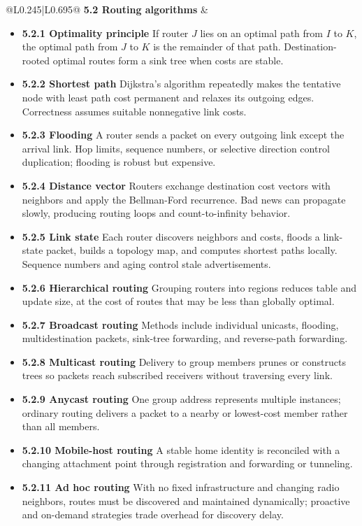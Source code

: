 \documentclass[10pt,letterpaper]{article}
\begin{document}
\begin{longtable}{@{}L{0.245\textwidth}|L{0.695\textwidth}@{}}
\textbf{5.2 Routing algorithms} & \begin{minipage}[t]{\linewidth}\raggedright \begin{itemize}\item \textbf{5.2.1 Optimality principle} If router $J$ lies on an optimal path from $I$ to $K$, the optimal path from $J$ to $K$ is the remainder of that path. Destination-rooted optimal routes form a sink tree when costs are stable.\item \textbf{5.2.2 Shortest path} Dijkstra's algorithm repeatedly makes the tentative node with least path cost permanent and relaxes its outgoing edges. Correctness assumes suitable nonnegative link costs.\item \textbf{5.2.3 Flooding} A router sends a packet on every outgoing link except the arrival link. Hop limits, sequence numbers, or selective direction control duplication; flooding is robust but expensive.\item \textbf{5.2.4 Distance vector} Routers exchange destination cost vectors with neighbors and apply the Bellman-Ford recurrence. Bad news can propagate slowly, producing routing loops and count-to-infinity behavior.\item \textbf{5.2.5 Link state} Each router discovers neighbors and costs, floods a link-state packet, builds a topology map, and computes shortest paths locally. Sequence numbers and aging control stale advertisements.\item \textbf{5.2.6 Hierarchical routing} Grouping routers into regions reduces table and update size, at the cost of routes that may be less than globally optimal.\item \textbf{5.2.7 Broadcast routing} Methods include individual unicasts, flooding, multidestination packets, sink-tree forwarding, and reverse-path forwarding.\item \textbf{5.2.8 Multicast routing} Delivery to group members prunes or constructs trees so packets reach subscribed receivers without traversing every link.\item \textbf{5.2.9 Anycast routing} One group address represents multiple instances; ordinary routing delivers a packet to a nearby or lowest-cost member rather than all members.\item \textbf{5.2.10 Mobile-host routing} A stable home identity is reconciled with a changing attachment point through registration and forwarding or tunneling.\item \textbf{5.2.11 Ad hoc routing} With no fixed infrastructure and changing radio neighbors, routes must be discovered and maintained dynamically; proactive and on-demand strategies trade overhead for discovery delay.\end{itemize}\end{minipage} \\ \hline

\end{longtable}
\end{document}
